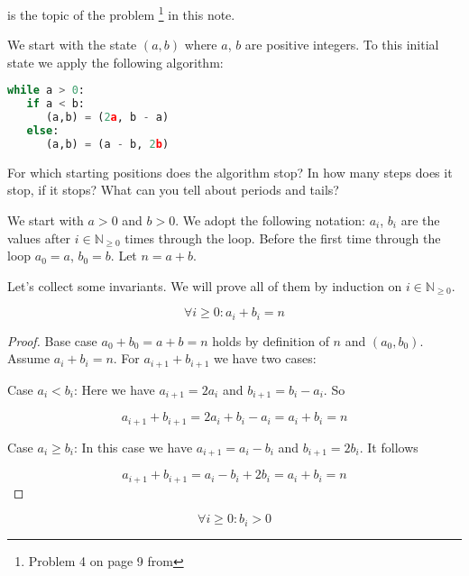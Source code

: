  is the topic of the problem \footnote{Problem 4 on page 9 from } in this note.


\vspace{10 mm}
\begin{problem}
We start with the state $(a, b)$ where $a$, $b$ are positive integers. To this initial state we apply the following algorithm:

\begin{lstlisting}[language=Python, basicstyle=\small, label={lst:while_loop}, frame=trBL]
while a > 0:
   if a < b:
      (a,b) = (2a, b - a)
   else:
      (a,b) = (a - b, 2b) 
\end{lstlisting}

For which starting positions does the algorithm stop? In how many steps does it stop,
if it stops? What can you tell about periods and tails?

\end{problem}

We start with $a > 0$ and $b > 0$. We adopt the following notation: $a_i$, $b_i$ are the values after $i \in \mathbb{N}_{\geq 0}$ times through the loop. Before the first time through the loop $a_0 = a$, $b_0 = b$. Let $n = a + b$.

Let's collect some invariants. We will prove all of them by induction on $i \in \mathbb{N}_{\geq 0}$.

\begin{thminv}\label{p1}
$$
  \forall i \geq 0: a_i + b_i = n
$$
\end{thminv}

\begin{proof}
Base case $a_0 + b_0 = a + b = n$ holds by definition of $n$ and $(a_0, b_0)$.
Assume $a_i + b_i = n$. For $a_{i+1} + b_{i+1}$ we have two cases:

Case $a_i < b_i$: Here we have $a_{i+1} = 2 a_i$ and $b_{i+1} = b_i - a_i$. So

$$
a_{i+1} + b_{i+1} = 2 a_i + b_i - a_i = a_i + b_i = n
$$

Case $a_i \geq b_i$: In this case we have  $a_{i+1} = a_i - b_i$ and $b_{i+1} = 2 b_i$. It follows

$$
a_{i+1} + b_{i+1} = a_i - b_i + 2 b_i = a_i + b_i = n
$$

\end{proof}

\begin{thminv}\label{p2}
$$
  \forall i \geq 0: b_i > 0
$$
\end{thminv}

